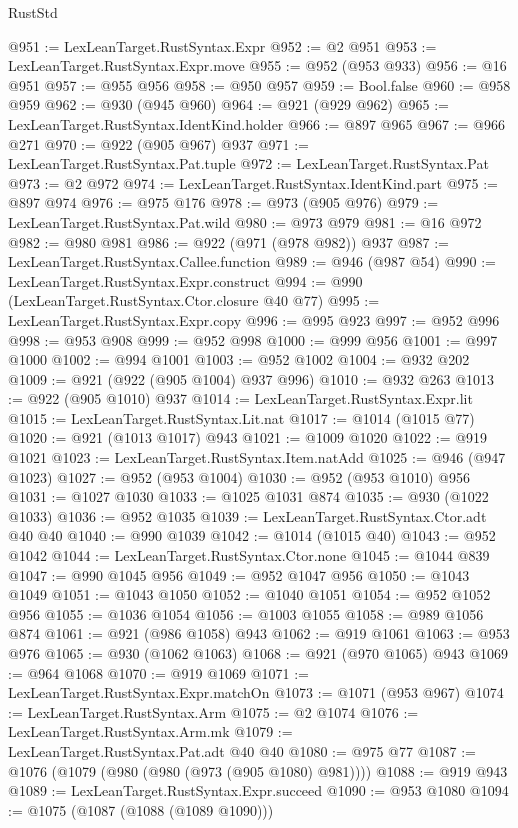 \begin{lexlean}{RustStd}
\begin{coremodule}
@951 := LexLeanTarget.RustSyntax.Expr
@952 := @2 @951
@953 := LexLeanTarget.RustSyntax.Expr.move
@955 := @952 (@953 @933)
@956 := @16 @951
@957 := @955 @956
@958 := @950 @957
@959 := Bool.false
@960 := @958 @959
@962 := @930 (@945 @960)
@964 := @921 (@929 @962)
@965 := LexLeanTarget.RustSyntax.IdentKind.holder
@966 := @897 @965
@967 := @966 @271
@970 := @922 (@905 @967) @937
@971 := LexLeanTarget.RustSyntax.Pat.tuple
@972 := LexLeanTarget.RustSyntax.Pat
@973 := @2 @972
@974 := LexLeanTarget.RustSyntax.IdentKind.part
@975 := @897 @974
@976 := @975 @176
@978 := @973 (@905 @976)
@979 := LexLeanTarget.RustSyntax.Pat.wild
@980 := @973 @979
@981 := @16 @972
@982 := @980 @981
@986 := @922 (@971 (@978 @982)) @937
@987 := LexLeanTarget.RustSyntax.Callee.function
@989 := @946 (@987 @54)
@990 := LexLeanTarget.RustSyntax.Expr.construct
@994 := @990 (LexLeanTarget.RustSyntax.Ctor.closure @40 @77)
@995 := LexLeanTarget.RustSyntax.Expr.copy
@996 := @995 @923
@997 := @952 @996
@998 := @953 @908
@999 := @952 @998
@1000 := @999 @956
@1001 := @997 @1000
@1002 := @994 @1001
@1003 := @952 @1002
@1004 := @932 @202
@1009 := @921 (@922 (@905 @1004) @937 @996)
@1010 := @932 @263
@1013 := @922 (@905 @1010) @937
@1014 := LexLeanTarget.RustSyntax.Expr.lit
@1015 := LexLeanTarget.RustSyntax.Lit.nat
@1017 := @1014 (@1015 @77)
@1020 := @921 (@1013 @1017) @943
@1021 := @1009 @1020
@1022 := @919 @1021
@1023 := LexLeanTarget.RustSyntax.Item.natAdd
@1025 := @946 (@947 @1023)
@1027 := @952 (@953 @1004)
@1030 := @952 (@953 @1010) @956
@1031 := @1027 @1030
@1033 := @1025 @1031 @874
@1035 := @930 (@1022 @1033)
@1036 := @952 @1035
@1039 := LexLeanTarget.RustSyntax.Ctor.adt @40 @40
@1040 := @990 @1039
@1042 := @1014 (@1015 @40)
@1043 := @952 @1042
@1044 := LexLeanTarget.RustSyntax.Ctor.none
@1045 := @1044 @839
@1047 := @990 @1045 @956
@1049 := @952 @1047 @956
@1050 := @1043 @1049
@1051 := @1043 @1050
@1052 := @1040 @1051
@1054 := @952 @1052 @956
@1055 := @1036 @1054
@1056 := @1003 @1055
@1058 := @989 @1056 @874
@1061 := @921 (@986 @1058) @943
@1062 := @919 @1061
@1063 := @953 @976
@1065 := @930 (@1062 @1063)
@1068 := @921 (@970 @1065) @943
@1069 := @964 @1068
@1070 := @919 @1069
@1071 := LexLeanTarget.RustSyntax.Expr.matchOn
@1073 := @1071 (@953 @967)
@1074 := LexLeanTarget.RustSyntax.Arm
@1075 := @2 @1074
@1076 := LexLeanTarget.RustSyntax.Arm.mk
@1079 := LexLeanTarget.RustSyntax.Pat.adt @40 @40
@1080 := @975 @77
@1087 := @1076 (@1079 (@980 (@980 (@973 (@905 @1080) @981))))
@1088 := @919 @943
@1089 := LexLeanTarget.RustSyntax.Expr.succeed
@1090 := @953 @1080
@1094 := @1075 (@1087 (@1088 (@1089 @1090)))

\end{coremodule}
\end{lexlean}
